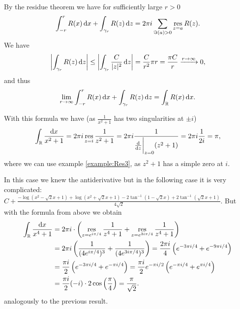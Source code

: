 \documentclass[a4paper,english]{article}
\begin{document}
\begin{example}
\begin{pr}
        By the residue theorem we have for sufficiently large $r > 0$
        \begin{equation*}
            \int_{-r}^{r} R(x) \mathop{}\!\mathrm{d}{x} + \int_{\gamma_r} R(z) \mathop{}\!\mathrm{d}{z}
            = 2 \pi i \sum_{\Im(a) > 0} \operatorname*{res}_{z = a} R(z).
        \end{equation*}
        We have
        \begin{align*}
            \left|\int_{\gamma_r} R(z) \mathop{}\!\mathrm{d}{z}\right|
            \le \left|\int_{\gamma_r} \frac{C}{| z |^2} \mathop{}\!\mathrm{d}{z} \right|
            = \frac{C}{r^2} \pi r
            = \frac{\pi C}{r}
            \xrightarrow{r \to \infty} 0,
        \end{align*}
        and thus
        \begin{equation*}
            \lim_{r \to \infty} \int_{-r}^{r} R(x) \mathop{}\!\mathrm{d}{x} + \int_{\gamma_r} R(z) \mathop{}\!\mathrm{d}{z}
            = \int_{\operatorname{\mathbb{R}}} R(x) \mathop{}\!\mathrm{d}{x}.
        \end{equation*}
    \end{pr}
    With this formula we have (as $\frac{1}{x^2 + 1}$ has two singularities at $\pm i$)
    \begin{equation*}
        \int_{\operatorname{\mathbb{R}}} \frac{\mathop{}\!\mathrm{d}{x}}{x^2 + 1}
        = 2 \pi i \operatorname*{res}_{z = i} \frac{1}{z^2 + 1}
        = 2 \pi i  \frac{1}{\frac{\mathop{}\!\mathrm{d}}{\mathop{}\!\mathrm{d}{z}}\bigg|_{z = 0} (z^2 + 1)}
        = 2 \pi i \frac{1}{2 i} 
        = \pi,
    \end{equation*}
    where we can use example \ref{example:Res3}, as $z^2 + 1$ has a simple zero at $i$.
    
    In this case we knew the antiderivative but in the following case it is very complicated: \tiny$C+\frac{-\log \left(x^2-\sqrt{2} x+1\right)+\log \left(x^2+\sqrt{2} x+1\right)-2 \tan ^{-1}\left(1-\sqrt{2}
x\right)+2 \tan ^{-1}\left(\sqrt{2} x+1\right)}{4 \sqrt{2}}$.\normalsize
    But with the formula from above we obtain
    \begin{align*}
        \int_{\operatorname{\mathbb{R}}} \frac{\mathop{}\!\mathrm{d}{x}}{x^4 + 1}
        & = 2 \pi i \cdot \left(\operatorname*{res}_{z = e^{i \pi / 4}} \frac{1}{z^4 + 1} + \operatorname*{res}_{z = e^{3 i \pi / 4}} \frac{1}{z^4 + 1} \right) \\
        & = 2 \pi i \left( \frac{1}{(4 e^{i \pi / 4})^3} + \frac{1}{(4 e^{3 i \pi / 4})^3} \right)
        = \frac{2 \pi i}{4} \left( e^{-3 \pi i / 4} + e^{- 9 \pi i / 4}\right) \\
        & = \frac{\pi i }{2} \left( e^{-3 \pi i / 4} + e^{- \pi i / 4}\right) 
        = \frac{\pi i }{2} e^{- \pi i/ 2} \left( e^{-\pi i / 4} + e^{\pi i / 4}\right) \\
        & = \frac{\pi i }{2} (-i) \cdot 2 \cos\left(\frac{\pi}{4}\right)
        = \frac{\pi}{\sqrt{2}}.
    \end{align*}
    analogously to the previous result.
    

\end{example}
\end{document}

